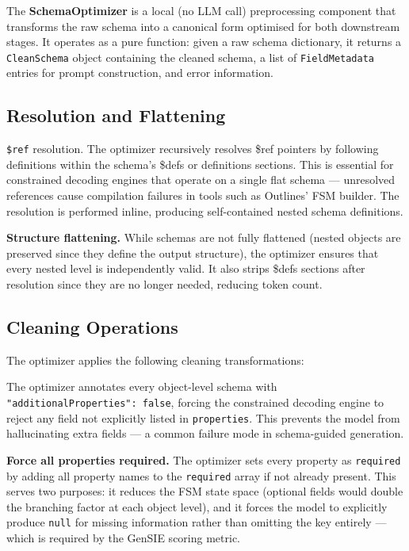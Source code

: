 \documentclass{ceurart}
\begin{document}
The \textbf{SchemaOptimizer} is a local (no LLM call) preprocessing component that
transforms the raw schema into a canonical form optimised for both downstream stages.
It operates as a pure function: given a raw schema dictionary, it returns a
\texttt{CleanSchema} object containing the cleaned schema, a list of
\texttt{FieldMetadata} entries for prompt construction, and error information.

\subsection{Resolution and Flattening}

\texttt{\$ref} resolution.
The optimizer recursively resolves \$ref pointers by following definitions within the
schema's \$defs or definitions sections.
This is essential for constrained decoding engines that operate on a single flat
schema --- unresolved references cause compilation failures in tools such as
Outlines' FSM builder.
The resolution is performed inline, producing self-contained nested schema definitions.

\textbf{Structure flattening.}
While schemas are not fully flattened (nested objects are preserved since they define
the output structure), the optimizer ensures that every nested level is independently
valid.
It also strips \$defs sections after resolution since they are no longer needed,
reducing token count.

\subsection{Cleaning Operations}

The optimizer applies the following cleaning transformations:

The optimizer annotates every object-level schema with \texttt{"additionalProperties": false},
forcing the constrained decoding engine to reject any field not explicitly listed in
\texttt{properties}.
This prevents the model from hallucinating extra fields --- a common failure mode in
schema-guided generation.

\textbf{Force all properties required.}
The optimizer sets every property as \texttt{required} by adding all property names to
the \texttt{required} array if not already present.
This serves two purposes: it reduces the FSM state space (optional fields would double
the branching factor at each object level), and it forces the model to explicitly
produce \texttt{null} for missing information rather than omitting the key entirely
--- which is required by the GenSIE scoring metric.
\end{document}
